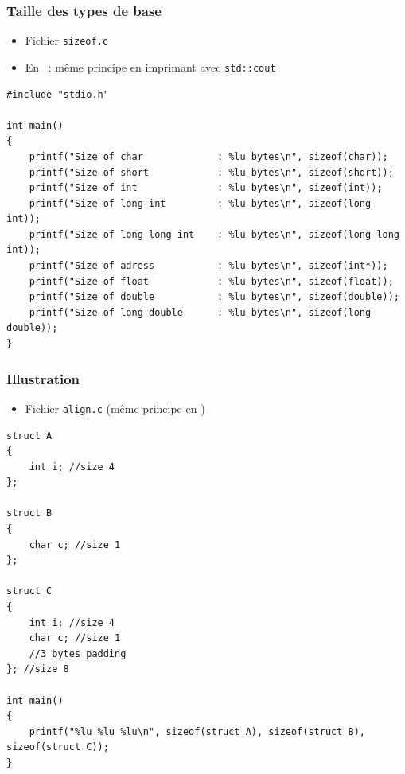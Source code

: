 \begin{frame}[containsverbatim]
\frametitle{Taille des types de base}
\begin{itemize}
\item Fichier \texttt{sizeof.c}
\item En \cpp\ : même principe en imprimant avec \texttt{std::cout}
\end{itemize}
\begin{lstlisting}
#include "stdio.h"

int main()
{
	printf("Size of char             : %lu bytes\n", sizeof(char));
	printf("Size of short            : %lu bytes\n", sizeof(short));
	printf("Size of int              : %lu bytes\n", sizeof(int));
	printf("Size of long int         : %lu bytes\n", sizeof(long int));
	printf("Size of long long int    : %lu bytes\n", sizeof(long long int));
	printf("Size of adress           : %lu bytes\n", sizeof(int*));
	printf("Size of float            : %lu bytes\n", sizeof(float));
	printf("Size of double           : %lu bytes\n", sizeof(double));
	printf("Size of long double      : %lu bytes\n", sizeof(long double));
}
\end{lstlisting}
\end{frame}

\begin{frame}[containsverbatim]
\frametitle{Illustration}
\begin{itemize}
\item Fichier \texttt{align.c} (même principe en \cpp)
\end{itemize}
\begin{lstlisting}
struct A
{
	int i; //size 4
};

struct B
{
	char c; //size 1
};

struct C
{
	int i; //size 4
	char c; //size 1
	//3 bytes padding
}; //size 8

int main()
{
	printf("%lu %lu %lu\n", sizeof(struct A), sizeof(struct B), sizeof(struct C));
}
\end{lstlisting}
\end{frame}

